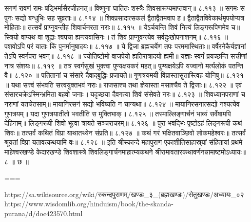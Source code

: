 सगणं रावणं रामः षड्भिर्मासैरजीहनत्॥
विष्णुना घातितः शस्त्रैः शिवसारूप्यमाप्तवान्॥ ८.११३ ॥
सगमः स पुनः सद्यो बन्धुभिः सह सुव्रताः॥ ८.११४ ॥
शिवप्रसादात्सकलं द्वैताद्वैतमवाप ह॥
द्वैताद्वैतविवेकार्थमृपयोप्यत्र मोहिताः॥
तत्सर्वं प्राप्नुवन्तीह शिवार्चनरता नराः॥ ८.११५ ॥
येऽर्चयन्ति शिवं नित्यं लिङ्गरूपिणमेव च॥
स्त्रियो वाप्यथ वा शूद्राः श्वपचा ह्यन्त्यवासिनः॥
तं शिवं प्राप्नुवन्त्येव सर्वदुःखोपनाशनम्॥ ८.११६ ॥
पशवोऽपि परं याताः किं पुनर्मानुषादयः॥ ८.११७ ॥
ये द्विजा ब्रह्मचर्येण तपः परममास्थिताः॥
वर्षैरनेकैर्यज्ञानां तेऽपि स्वर्गपरा भवन्॥ ८.११८ ॥
ज्योतिष्टोमो वाजपेयो ह्यतिरात्रादयो ह्यमी॥
यज्ञाः स्वर्गं प्रयच्छन्ति सत्त्रीणां नात्र संशयः॥ ८.११९ ॥
तत्र स्वर्गसुखं भुक्त्वा पुण्यक्षयकरं महत्॥
पुण्यक्षयेऽपि यज्वानो मर्त्यलोकं पतन्ति वै॥ ८.१२० ॥
पतितानां च संसारे दैवाद्बुद्धिः प्रजायते॥
गुणत्रयमयी विप्रास्तासुतास्त्विह योनिषु॥ ८.१२१ ॥
यथा सत्त्वं संभवति सत्त्वयुक्तभवं नराः॥
राजसाश्च तथा ज्ञेयास्ता मसाश्चैव ते द्विजाः॥ ८.१२२ ॥
एवं संसारचक्रेऽस्मिन्भ्रमिता बहवो जनाः॥
यदृच्छया दैवगत्या शिवं संसेवते नरः॥ ८.१२३ ॥
शिवध्यानपराणां च नराणां यतचेतसाम्॥
मायानिरसनं सद्यो भविष्यति न चान्यथा॥ ८.१२४ ॥
मायानिरसनात्सद्यो नश्यत्येव गुणत्रयम्॥
यदा गुणत्रयातीतो भवतीति स मुक्तिभाक्॥ ८.१२५ ॥
तस्माल्लिङ्गार्चनं भाव्यं सर्वेषामपि देहिनाम्॥
लिङ्गरूपी शिवो भूत्वा त्रायते सञ्चराचरम्॥ ८.१२६ ॥
पुरा भवद्भिः पृष्टोऽहं लिङ्गरूपी कथं शिवः॥
तत्सर्वं कथितं विप्रा याथातथ्येन संप्रति॥ ८.१२७ ॥
कथं गरं भक्षितवाञ्छिवो लोकमहेश्वरः॥
तत्सर्वं श्रूयतां विप्रा यतावत्कथयामि वः॥ ८.१२८ ॥
इति श्रीस्कान्दे महापुराण एकाशीतिसाहास्र्यां संहितायां प्रथमे माहेश्वरखण्डे केदारखण्डे शिवशास्त्रे शिवलिङ्गार्चनमाहात्म्यकथने श्रीरामावतारकथावर्णनन्नामाष्टमोऽध्यायः॥ ८ ॥ छ ॥


===

https://sa.wikisource.org/wiki/स्कन्दपुराणम्/खण्डः_३_(ब्रह्मखण्डः)/सेतुखण्डः/अध्यायः_०२
https://www.wisdomlib.org/hinduism/book/the-skanda-purana/d/doc423570.html

